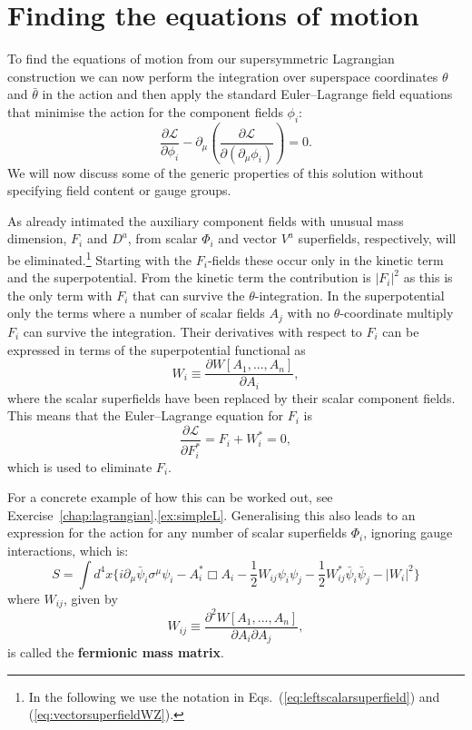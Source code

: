 \documentclass[notes.tex]{subfiles}
\begin{document}
\section{Finding the equations of motion}

To find the equations of motion from our supersymmetric Lagrangian construction we can now perform the integration over superspace coordinates $\theta$  and $\bar\theta$ in the action and then apply the standard Euler--Lagrange field equations that minimise the action for the component fields $\phi_i$:
\begin{equation}
\frac{\partial\mathcal{L}}{\partial\phi_i}-\partial_\mu\left(\frac{\partial\mathcal{L}}{\partial(\partial_\mu\phi_i)}\right)=0.
\end{equation}
We will now discuss some of the generic properties of this solution without specifying field content or gauge groups. 

As already intimated the auxiliary component fields with unusual mass dimension, $F_i$ and $D^a$, from scalar $\Phi_i$ and vector $V^a$ superfields, respectively, will be eliminated.\footnote{In the following we use the notation in Eqs.~(\ref{eq:leftscalarsuperfield}) and (\ref{eq:vectorsuperfieldWZ}).} 
Starting with the $F_i$-fields these occur only in the kinetic term and the superpotential. From the kinetic term the contribution is $|F_i|^2$ as this is the only term with $F_i$ that can survive the $\theta$-integration. In the superpotential only the terms where a number of scalar fields $A_j$ with no $\theta$-coordinate multiply $F_i$ can survive the integration. Their derivatives with respect to $F_i$ can be expressed in terms of the superpotential functional as 
\begin{equation}
W_i \equiv \frac{\partial W[A_1, ... , A_n]}{\partial A_i},
\end{equation}
where the scalar superfields have been replaced by their scalar component fields. This means that the Euler--Lagrange equation for $F_i$ is
\[\frac{\partial \mathcal{L}}{\partial F_i^*} = F_i + W_i^* = 0,\]
which is used to eliminate $F_i$. 

For a concrete example of how this can be worked out, see Exercise~\ref{chap:lagrangian}.\ref{ex:simpleL}. Generalising this also leads to an expression for the action for any number of scalar superfields $\Phi_i$, ignoring gauge interactions, which is:
\[S = \int d^4x\{i\partial_\mu \bar{\psi}_i\sigma^\mu \psi_i - A^*_i\Box A_i -\frac{1}{2}W_{ij}\psi_i\psi_j - \frac{1}{2}W^*_{ij}\bar{\psi}_i\bar{\psi}_j - |W_i|^2\}\]
where $W_{ij}$, given by
\begin{equation}
W_{ij} \equiv \frac{\partial^2W[A_1, ...  ,A_n]}{\partial A_i \partial A_j},
\label{eq:fermionic_mass_matrix}
\end{equation}
is called the {\bf fermionic mass matrix}.
\end{document}
